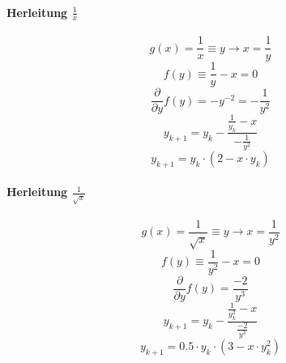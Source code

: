 \begin{multicols}{2}
	\paragraph{Herleitung $\frac{1}{x}$}
	\begin{equation}
	g(x)=\frac{1}{x} \equiv y \rightarrow x=\frac{1}{y}
	\end{equation}
	\begin{equation}
	f(y) \equiv \frac{1}{y}-x = 0
	\end{equation}
	\begin{equation}
	\frac{\partial}{\partial y} f(y)=-y^{-2}=-\frac{1}{y^2}
	\end{equation}
	\begin{equation}
	y_{k+1}=y_k-\frac{\frac{1}{y_k}-x}{-\frac{1}{y^2}}
	\end{equation}
	\begin{equation}
	y_{k+1}=y_k \cdot (2-x \cdot y_k)
	\end{equation}
\columnbreak
	\paragraph{Herleitung $\frac{1}{\sqrt{x}}$}
	\begin{equation}
	g(x)=\frac{1}{\sqrt{x}} \equiv y \rightarrow x=\frac{1}{y^2}
	\end{equation}
	\begin{equation}
	f(y) \equiv \frac{1}{y^2}-x = 0
	\end{equation}
	\begin{equation}
	\frac{\partial}{\partial y} f(y)=\frac{-2}{y^3}
	\end{equation}
	\begin{equation}
	y_{k+1}=y_k-\frac{\frac{1}{y_k^2}-x}{\frac{-2}{y^3}}
	\end{equation}
	\begin{equation}
	y_{k+1}=0.5 \cdot y_k \cdot (3-x \cdot y_k^2)
	\end{equation}
\end{multicols}
